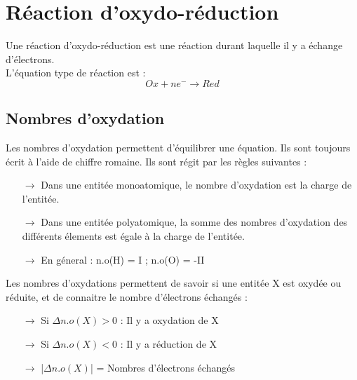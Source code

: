\chapter{Réaction d'oxydo-réduction}
\begin{de}
Une réaction d'oxydo-réduction est une réaction durant laquelle il y a échange d'électrons.\\
L'équation type de réaction est :
$$Ox + ne^- \rightarrow Red$$
\end{de}
\section{Nombres d'oxydation}
Les nombres d'oxydation permettent d'équilibrer une équation. Ils sont toujours écrit à l'aide de chiffre romaine. Ils sont régit par les règles suivantes :\\
\begin{itemize}
 \item[$\rightarrow$] Dans une entitée monoatomique, le nombre d'oxydation est la charge de l'entitée.\\
 \item[$\rightarrow$] Dans une entitée polyatomique, la somme des nombres d'oxydation des différents élements est égale à la charge de l'entitée.\\
 \item[$\rightarrow$] En géneral : n.o(H) = I ; n.o(O) = -II\\
\end{itemize}
Les nombres d'oxydations permettent de savoir si une entitée X est oxydée ou réduite, et de connaitre le nombre d'électrons échangés :\\
\begin{itemize}
 \item[$\rightarrow$] Si $\Delta n.o(X) > 0 $ : Il y a oxydation de X\\
 \item[$\rightarrow$] Si $\Delta n.o(X) < 0 $ : Il y a réduction de X\\
\item[$\rightarrow$] |$\Delta n.o(X)$| = Nombres d'électrons échangés\\
\end{itemize}
